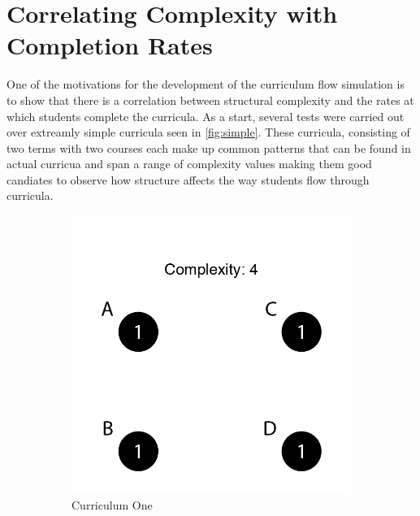 \documentclass[botnum, fleqn]{unmeethesis}
\begin{document}
\section{Correlating Complexity with Completion Rates}

One of the motivations for the development of the curriculum flow simulation is to show that there is a correlation between structural complexity and the rates at which students complete the curricula. As a start, several tests were carried out over extreamly simple curricula seen in \ref{fig:simple}. These curricula, consisting of two terms with two courses each make up common patterns that can be found in actual curricua and span a range of complexity values making them good candiates to observe how structure affects the way students flow through curricula.

\begin{figure}
\centering
\begin{subfigure}[h!]{.3\linewidth}
\includegraphics[width=\linewidth]{./figures/Simple4.png}
\caption{Curriculum One}\label{fig:simple4}
\end{subfigure}
\begin{subfigure}[h!]{.3\linewidth}

\end{subfigure}
\end{figure}
\end{document}
